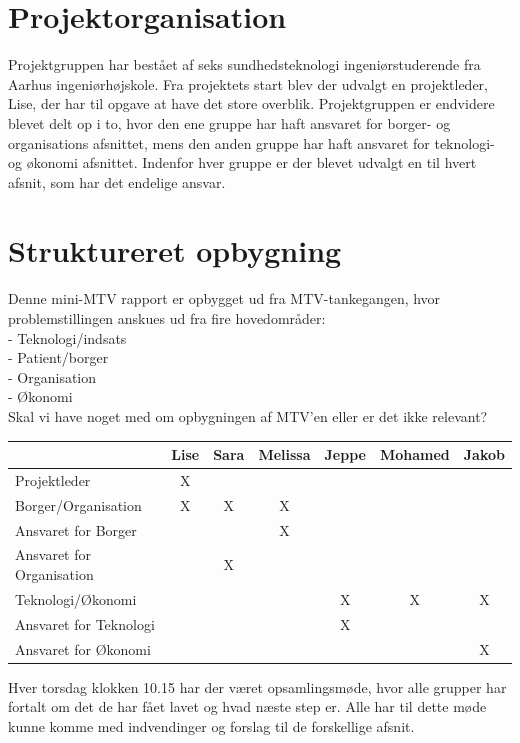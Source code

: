 \section{Projektorganisation}
Projektgruppen har bestået af seks sundhedsteknologi ingeniørstuderende fra Aarhus ingeniørhøjskole. Fra projektets start blev der udvalgt en projektleder, Lise, der har til opgave at have det store overblik. Projektgruppen er endvidere blevet delt op i to, hvor den ene gruppe har haft ansvaret for borger- og organisations afsnittet, mens den anden gruppe har haft ansvaret for teknologi- og økonomi afsnittet. Indenfor hver gruppe er der blevet udvalgt en til hvert afsnit, som har det endelige ansvar. 

\section{Struktureret opbygning}
Denne mini-MTV rapport er opbygget ud fra MTV-tankegangen, hvor problemstillingen anskues ud fra fire hovedområder:\\
-	Teknologi/indsats\\
-	Patient/borger\\
-	Organisation\\
-	Økonomi\\
Skal vi have noget med om opbygningen af MTV’en eller er det ikke relevant? 


\begin{table}[h]
\begin{tabular}{lcccccc}
& Lise & Sara & Melissa &Jeppe &Mohamed & Jakob\\
\midrule
Projektleder &  X & & & & &\\
\midrule
Borger/Organisation &X & X & X & & &\\
Ansvaret for Borger & &  & X& & &\\
Ansvaret for Organisation & & X&  & & &\\
\midrule
Teknologi/Økonomi & & & & X &  X & X\\
Ansvaret for Teknologi & & & & X & &\\
Ansvaret for Økonomi & & & & & &X\\

\end{tabular}
\end{table} 

Hver torsdag klokken 10.15 har der været opsamlingsmøde, hvor alle grupper har fortalt om det de har fået lavet og hvad næste step er. Alle har til dette møde kunne komme med indvendinger og forslag til de forskellige afsnit.   
	

